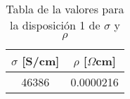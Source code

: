 \begin{table}[h!]
    \centering
\begin{tabular}{cc}
\toprule
$\sigma$ [S/cm] & $\rho$ [$\Omega$cm] \\
\midrule
46386 & 0.0000216 \\
\bottomrule
\end{tabular}
    \caption{Tabla de la valores para la disposición 1 de $\sigma$ y $\rho $}
    \label{Tab:RS_1}
\end{table}
